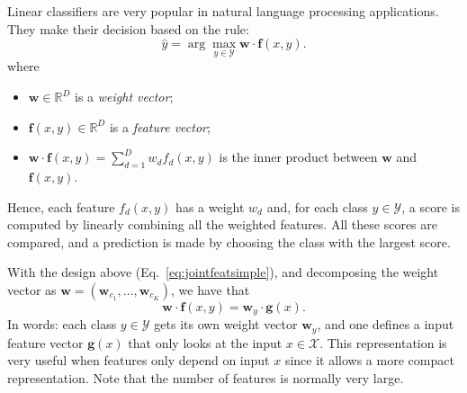 Linear classifiers are very popular in natural language processing applications. 
They make their decision based on the rule:
\begin{equation}
{\hat y} = \arg\max_{y \in \mathcal{Y}} \boldsymbol{w} \cdot \boldsymbol{f}(x,y).
\end{equation}
where
\begin{itemize}
\item $\boldsymbol{w} \in \mathbb{R}^D$ is a \emph{weight vector};
\item $\boldsymbol{f}(x,y) \in \mathbb{R}^D$ is a \emph{feature vector};
\item $\boldsymbol{w} \cdot \boldsymbol{f}(x,y) = \sum_{d=1}^D w_d f_d(x,y)$ is the inner product between $\boldsymbol{w}$ and $\boldsymbol{f}(x,y)$. 
\end{itemize}
Hence, each feature $f_d(x,y)$ has a weight $w_d$ and, for each class $y \in \mathcal{Y}$, 
a score is computed by linearly combining all the weighted features. All these scores are compared, 
and a prediction is made 
by choosing the class with the largest score. 

\begin{remark}
With the design above (Eq.~\ref{eq:jointfeatsimple}), and 
decomposing the weight vector as 
$\boldsymbol{w} = (\boldsymbol{w}_{c_1},\ldots,\boldsymbol{w}_{c_K})$, we 
have that 
\begin{equation}
\boldsymbol{w} \cdot \boldsymbol{f}(x,y) = \boldsymbol{w}_y \cdot \boldsymbol{g}(x).
\end{equation}
In words: each class $y \in \mathcal{Y}$ gets its own weight vector $\boldsymbol{w}_y$, 
and one defines a input feature vector $\boldsymbol{g}(x)$ that only
looks at the input $x \in \mathcal{X}$. This representation is very
useful when features only depend on input $x$ since it allows a more
compact representation. Note that the number of features is normally
very large.
\end{remark}






